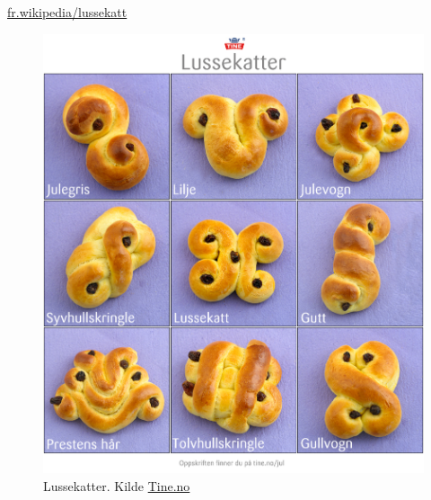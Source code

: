 \href{https://fr.wikipedia.org/wiki/Lussekatt}{fr.wikipedia/lussekatt}


\begin{figure}[p]
	\includegraphics[width=\textwidth]{bilder/lussekatter.png}
	\caption[Lussekatter]{Lussekatter. Kilde \href{http://www.tine.no/imageresize/383493_999_1150.png}{Tine.no}}
	\label{lussekatter}
\end{figure}
